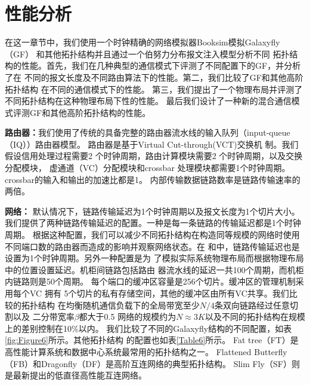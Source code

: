 \section{性能分析}

在这一章节中，我们使用一个时钟精确的网络模拟器Booksim模拟Galaxyfly（GF）
和其他拓扑结构并且通过一个伯努力分布报文注入模型分析不同
拓扑结构的性能。首先，我们在几种典型的通信模式下评测了不同配置下的GF，并分析了在
不同的报文长度及不同路由算法下的性能。第二，我们比较了GF和其他高阶拓扑结构
在不同的通信模式下的性能。
第三，我们提出了一个物理布局并评测了不同拓扑结构在这种物理布局下性的性能。
最后我们设计了一种新的混合通信模式评测GF和其他高阶拓扑结构的性能。

\textbf{路由器：}我们使用了传统的具备完整的路由器流水线的输入队列（input-queue （IQ））路由器模型。
路由器是基于Virtual Cut-through(VCT)交换机
制。我们假设信用处理过程需要2 个时钟周期，路由计算模块需要2 个时钟周期，以及交换分配模块，
虚通道（VC）分配模块和crossbar 处理模块都需要1个时钟周期。crossbar的输入和输出的加速比都是1。
内部传输数据链路数率是链路传输速率的两倍。

\textbf{网络：} 默认情况下，链路传输延迟为1个时钟周期以及报文长度为1个切片大小。
我们提供了两种链路传输延迟的配置。一种是每一条链路的传输延迟都是1个时钟周期。
根据这种配置，我们可以减少不同拓扑结构在构造同等规模的网络时使用不同端口数的路由器而造成的影响并观察网络状态。在
和中，链路传输延迟也是设置为1个时钟周期。另外一种配置是为
了模拟实际系统物理布局而根据物理布局中的位置设置延迟。机柜间链路包括路由
器流水线的延迟一共100个周期，而机柜内链路则是50个周期。
每个端口的缓冲区容量是256个切片。缓冲区的管理机制采用每个VC 拥有
5个切片的私有存储空间，其他的缓冲区由所有VC共享。我们比较的拓扑结构
在均衡随机通信负载下的全局带宽至少$N/4$条双向链路经过任意切割以及
二分带宽率$\beta$都大于0.5
网络的规模约为$N\approx 3K$以及不同的拓扑结构在规模上的差别控制在10\%以内。
我们比较了不同的Galaxyfly结构的不同配置，如表\ref{fig:Figure6}所示。其他拓扑结构
的配置也如表\ref{Table6}所示。
Fat tree（FT）是高性能计算系统和数据中心系统最常用的拓扑结构之一。
Flattened Butterfly（FB）和Dragonfly（DF）是高阶互连网络的典型拓扑结构。
Slim Fly（SF）则是最新提出的低直径高性能互连网络。


